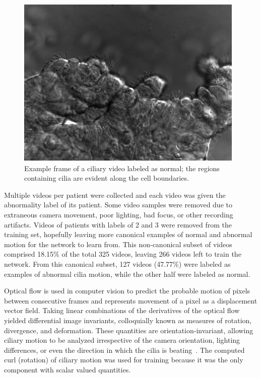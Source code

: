 \begin{figure}[htp]
\includegraphics[scale=0.78]{grey_1011-5_heathly}
\caption{Example frame of a ciliary video labeled as normal; the regions containing cilia are evident along the cell boundaries.}
\label{fig:cilia}
\end{figure}

Multiple videos per patient were collected and each video was given the abnormality label of its patient. Some video samples were removed due to extraneous camera movement, poor lighting, bad focus, or other recording artifacts. Videos of patients with labels of 2 and 3 were removed from the training set, hopefully leaving more canonical examples of normal and abnormal motion for the network to learn from. This non-canonical subset of videos comprised 18.15\% of  the total 325 videos, leaving 266 videos left to train the network. From this canonical subset, 127 videos (47.77\%) were labeled as examples of abnormal cilia motion, while the other half were labeled as normal.
 
Optical flow is used in computer vision to predict the probable motion of pixels between consecutive frames and represents movement of a pixel as a displacement vector field. Taking linear combinations of the derivatives of the optical flow yielded differential image invariants, colloquially known as measures of rotation, divergence, and deformation. These quantities are orientation-invariant, allowing ciliary motion to be analyzed irrespective of the camera orientation, lighting differences, or even the direction in which the cilia is beating~\cite{quinn2015automated}. The computed curl (rotation) of ciliary motion was used for training because it was the only component with scalar valued quantities. 
 
